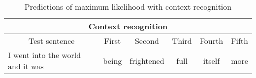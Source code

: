 \vspace{-1cm}
\begin{table}[H]
\centering
\caption{Predictions of maximum likelihood with context recognition}
{\scriptsize
\begin{tabular}{ |p{}|c|c|c|c|c| }
	\hline
	\multicolumn{6}{|c|}{Context recognition} \\
	\hline
	\multicolumn{1}{|c|}{Test sentence} & First & Second & Third & Fourth & Fifth\\
	\hline
	I went into the world and it was & being & frightened & full & itself & more \\
	\hline
\end{tabular}
}
\end{table}
